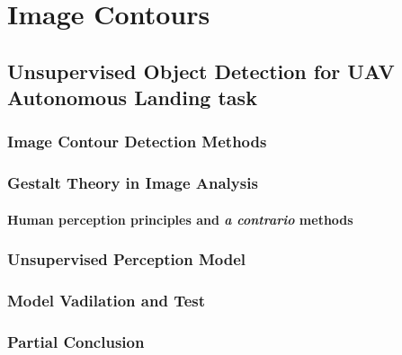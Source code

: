 \part{Image Contours}
\chapter{Unsupervised Object Detection for UAV Autonomous Landing task}
\section{Image Contour Detection Methods}
\section{Gestalt Theory in Image Analysis}
\subsection{Human perception principles and \textit{a contrario} methods}
\section{Unsupervised Perception Model}
\section{Model Vadilation and Test}
\section{Partial Conclusion}
